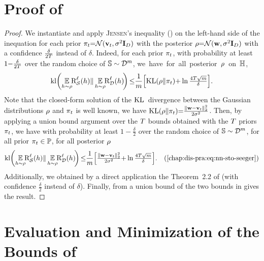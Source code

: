 \begin{noaddcontents}
\section{Proof of }
\label{chap:dis-pra:sec:proof-nn-sto}

\corollarynnsto*
\begin{proof}
We instantiate  and apply \textsc{Jensen}'s inequality () on the left-hand side of the inequation for each prior $\pi_t{=}\mathcal{N}(\mathbf{v}_t, \sigma^2\mathbf{I}_{D})$ with the posterior $\rho{=}\mathcal{N}(\mathbf{w}, \sigma^2\mathbf{I}_{D})$ with a confidence $\tfrac{\delta}{2T}$ instead of $\delta$.
Indeed, for each prior $\pi_t$, with probability at least $1{-}\tfrac{\delta}{2T}$ over the random choice of $\mathbb{S}\sim\mathcal{D}^m$, \mbox{we have for all posterior $\rho$ on $\mathbb{H}$},
\begin{align*}
\kl\!\LP\EE_{\h{\sim}\Q}\!\!\RiskLoss_{\dS}(\h)\| \EE_{\h{\sim}\Q}\!\!\RiskLoss_{\D}(\h)\!\RP{\le} \frac{1}{\m}\!\LB 
\KL(\Q\|\P_\t)
{+}\ln\tfrac{4\iter\sqrt{\m}}{\delta}\RB\!.
\end{align*}
Note that the closed-form solution of the $\operatorname{KL}$~divergence between the Gaussian distributions $\rho$ and $\pi_t$ is well known, we have $\operatorname{KL}(\rho\|\pi_t){=}\frac{\|\mathbf{w}{-}\mathbf{v}_t\|_{2}^{2}}{2\sigma^2}$.
Then, by applying a union bound argument over the $T$ bounds obtained with the $T$ priors $\pi_t$, we have with probability at least $1{-}\frac{\delta}{2}$ over the random choice of $\mathbb{S}\sim\mathcal{D}^m$, for all prior $\pi_t\in\mathbb{P}$, for all posterior $\rho$
\begin{align*}
\kl\!\LP\EE_{\h{\sim}\Q}\!\!\RiskLoss_{\dS}(\h)\| \EE_{\h{\sim}\Q}\!\!\RiskLoss_{\D}(\h)\!\RP{\le} \frac{1}{\m}\!\LB 
\tfrac{\|\wbf{-}\vbf_\t\|_{2}^{2}}{2\sigma^2}
{+}\ln\tfrac{4\iter\sqrt{\m}}{\delta}\RB\!.\quad\text{(\Cref{chap:dis-pra:eq:nn-sto-seeger})}
\end{align*}
Additionally, we obtained  by a direct application the Theorem~2.2 of \citet{DziugaiteRoy2017} (with confidence $\frac{\delta}{2}$ instead of $\delta$).
Finally, from a union bound of the two bounds in  gives the result.
\end{proof}

\section{Evaluation and Minimization of the Bounds of }
\label{chap:dis-pra:sec:evaluation-minimization}


\end{noaddcontents}
